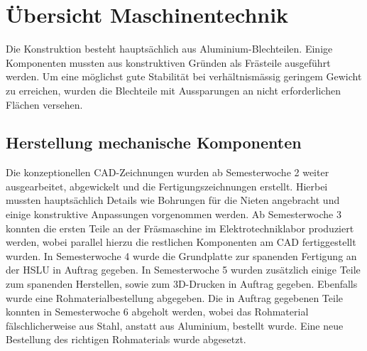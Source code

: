 \section{Übersicht Maschinentechnik}
Die Konstruktion besteht hauptsächlich aus Aluminium-Blechteilen. Einige 
Komponenten mussten aus konstruktiven Gründen als Frästeile ausgeführt werden.
Um eine möglichst gute Stabilität bei verhältnismässig geringem Gewicht zu 
erreichen, wurden die Blechteile mit Aussparungen an nicht erforderlichen 
Flächen versehen.

\subsection{Herstellung mechanische Komponenten}
Die konzeptionellen CAD-Zeichnungen wurden ab Semesterwoche 2 weiter 
ausgearbeitet, abgewickelt und die Fertigungszeichnungen erstellt. Hierbei 
mussten hauptsächlich Details wie Bohrungen für die Nieten angebracht und 
einige konstruktive Anpassungen vorgenommen werden. Ab Semesterwoche 3 konnten 
die ersten Teile an der Fräsmaschine im Elektrotechniklabor produziert werden, 
wobei parallel  hierzu die restlichen Komponenten am CAD fertiggestellt wurden.
In Semesterwoche 4 wurde die Grundplatte zur spanenden Fertigung an der HSLU 
in Auftrag gegeben.
In Semesterwoche 5 wurden zusätzlich einige Teile zum spanenden Herstellen, 
sowie zum 3D-Drucken in Auftrag gegeben. Ebenfalls wurde eine 
Rohmaterialbestellung abgegeben.
Die in Auftrag gegebenen Teile konnten in Semesterwoche 6 abgeholt werden, 
wobei das  Rohmaterial fälschlicherweise aus Stahl, anstatt aus Aluminium, 
bestellt wurde. Eine neue Bestellung des richtigen Rohmaterials wurde abgesetzt.
